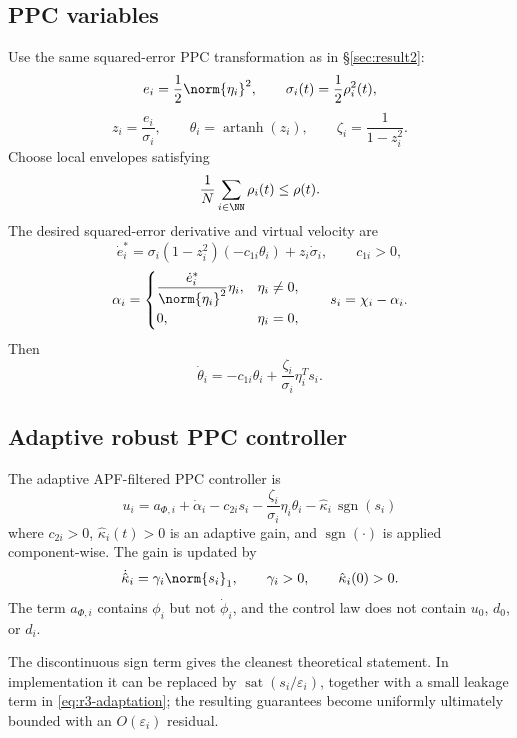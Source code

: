 \subsection{PPC variables}

Use the same squared-error PPC transformation as in \S\ref{sec:result2}:
\[
e_i=\frac12\norm{\eta_i}^2,\qquad
\sigma_i(t)=\frac12\rho_i^2(t),
\]
\[
z_i=\frac{e_i}{\sigma_i},\qquad
\theta_i=\operatorname{artanh}(z_i),\qquad
\zeta_i=\frac{1}{1-z_i^2}.
\]
Choose local envelopes satisfying
\[
\frac1N\sum_{i\in\NN}\rho_i(t)\le \rho(t).
\]
The desired squared-error derivative and virtual velocity are
\[
\dot e_i^*
=\sigma_i(1-z_i^2)(-c_{1i}\theta_i)+z_i\dot\sigma_i,
\qquad c_{1i}>0,
\]
\begin{equation}
\alpha_i=
\begin{cases}
\displaystyle
\frac{\dot e_i^*}{\norm{\eta_i}^2}\eta_i, & \eta_i\neq0,\\[8pt]
0, & \eta_i=0,
\end{cases}
\qquad
s_i=\chi_i-\alpha_i .
\label{eq:r3-alpha-s}
\end{equation}
Then
\[
\dot\theta_i
=-c_{1i}\theta_i+\frac{\zeta_i}{\sigma_i}\eta_i^Ts_i.
\]

\subsection{Adaptive robust PPC controller}

The adaptive APF-filtered PPC controller is
\begin{equation}
\boxed{
u_i=a_{\Phi,i}+\dot\alpha_i
-c_{2i}s_i
-\frac{\zeta_i}{\sigma_i}\eta_i\theta_i
-\hat\kappa_i\,\operatorname{sgn}(s_i)
}
\label{eq:r3-ui}
\end{equation}
where $c_{2i}>0$, $\hat\kappa_i(t)>0$ is an adaptive gain, and
$\operatorname{sgn}(\cdot)$ is applied component-wise.  The gain is updated
by
\begin{equation}
\dot{\hat\kappa}_i=\gamma_i\norm{s_i}_1,\qquad
\gamma_i>0,\qquad
\hat\kappa_i(0)>0.
\label{eq:r3-adaptation}
\end{equation}
The term $a_{\Phi,i}$ contains $\phi_i$ but not $\dot\phi_i$, and the
control law does not contain $u_0$, $d_0$, or $d_i$.

\begin{remark}
The discontinuous sign term gives the cleanest theoretical statement.  In
implementation it can be replaced by
$\operatorname{sat}(s_i/\varepsilon_i)$, together with a small leakage term
in \eqref{eq:r3-adaptation}; the resulting guarantees become uniformly
ultimately bounded with an $O(\varepsilon_i)$ residual.
\end{remark}

